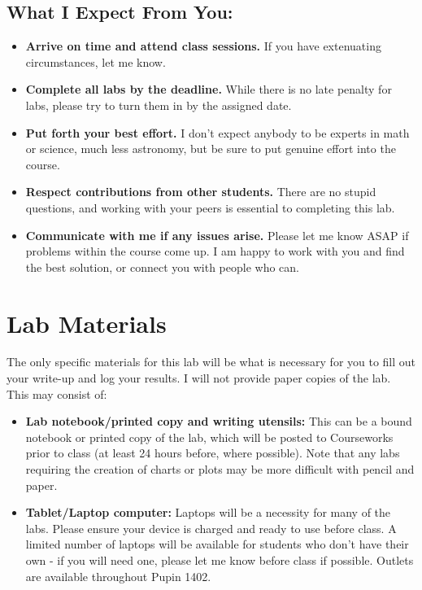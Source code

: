 \documentclass[11pt]{article}
\begin{document}
\subsection*{What I Expect From You:}

\begin{itemize}
\item \textbf{Arrive on time and attend class sessions.} If you have extenuating circumstances, let me know. 
\item \textbf{Complete all labs by the deadline.} While there is no late penalty for labs, please try to turn them in by the assigned date.
\item \textbf{Put forth your best effort.} I don't expect anybody to be experts in math or science, much less astronomy, but be sure to put genuine effort into the course.
\item \textbf{Respect contributions from other students.} There are no stupid questions, and working with your peers is essential to completing this lab.
\item \textbf{Communicate with me if any issues arise.} Please let me know ASAP if problems within the course come up. I am happy to work with you and find the best solution, or connect you with people who can.
\end{itemize}

\section*{Lab Materials}
 
The only specific materials for this lab will be what is necessary for you to fill out your write-up and log your results. I will not provide paper copies of the lab. This may consist of:
 
\begin{itemize}
\item \textbf{Lab notebook/printed copy and writing utensils:} This can be a bound notebook or printed copy of the lab, which will be posted to Courseworks prior to class (at least 24 hours before, where possible). Note that any labs requiring the creation of charts or plots may be more difficult with pencil and paper.
\item \textbf{Tablet/Laptop computer:} Laptops will be a necessity for many of the labs. Please ensure your device is charged and ready to use before class. A limited number of laptops will be available for students who don't have their own - if you will need one, please let me know before class if possible. Outlets are available throughout Pupin 1402. \\
\end{itemize}
\end{document}
